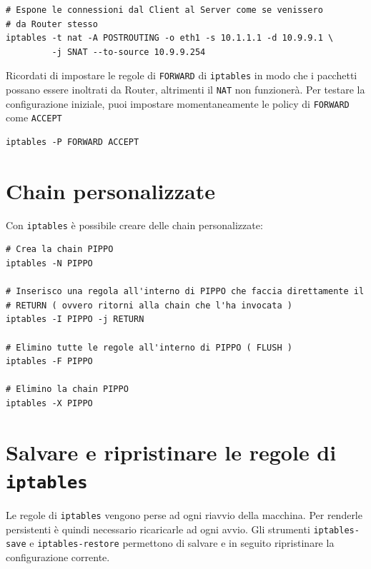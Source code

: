 \documentclass[a4paper]{report}
\newenvironment{ricordati}{\begin{tcolorbox}[fonttitle=\sffamily\bfseries\large,title=Ricordati,colframe=orange!75!white]}{\end{tcolorbox}}
\newenvironment{code}{\begin{tcolorbox}[size=small]}{\end{tcolorbox}}
\begin{document}
\begin{code}
\begin{lstlisting}
# Espone le connessioni dal Client al Server come se venissero 
# da Router stesso
iptables -t nat -A POSTROUTING -o eth1 -s 10.1.1.1 -d 10.9.9.1 \
         -j SNAT --to-source 10.9.9.254
\end{lstlisting}
\end{code}

\begin{ricordati}
	Ricordati di impostare le regole di \texttt{FORWARD} di \texttt{iptables} in modo che i pacchetti possano essere inoltrati da Router, altrimenti il \texttt{NAT} non funzionerà. Per testare la configurazione iniziale, puoi impostare momentaneamente le policy di \texttt{FORWARD} come \texttt{ACCEPT}
	\begin{lstlisting}
iptables -P FORWARD ACCEPT
	\end{lstlisting}
\end{ricordati}

\section{Chain personalizzate}

Con \texttt{iptables} è possibile creare delle chain personalizzate:

\begin{code}
\begin{lstlisting}
# Crea la chain PIPPO
iptables -N PIPPO

# Inserisco una regola all'interno di PIPPO che faccia direttamente il
# RETURN ( ovvero ritorni alla chain che l'ha invocata )
iptables -I PIPPO -j RETURN

# Elimino tutte le regole all'interno di PIPPO ( FLUSH )
iptables -F PIPPO

# Elimino la chain PIPPO
iptables -X PIPPO
\end{lstlisting}
\end{code}

\section{Salvare e ripristinare le regole di \texttt{iptables}}

Le regole di \texttt{iptables} vengono perse ad ogni riavvio della macchina. Per renderle persistenti è quindi necessario ricaricarle ad ogni avvio. Gli strumenti \texttt{iptables-save} e \texttt{iptables-restore} permettono di salvare e in seguito ripristinare la configurazione corrente.
\end{document}
